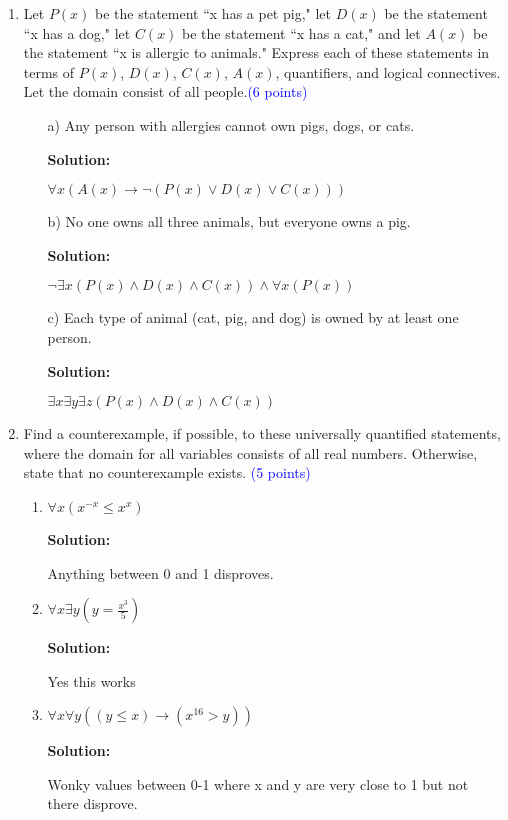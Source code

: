 \documentclass{article}
\newcommand{\pt}[1]{\textcolor{blue}{(#1 points)}}
\newenvironment{solution}
{
\par
\color{blue}
\textbf{Solution:}
}
{
\par
}
\begin{document}
\begin{enumerate}
    \item Let $P(x)$ be the statement ``x has a pet pig," let $D(x)$ be the statement ``x has a dog," let $C(x)$ be the statement ``x has a cat," and let $A(x)$ be the statement ``x is allergic to animals." Express each of these statements in terms of $P(x)$, $D(x)$, $C(x)$, $A(x)$, quantifiers, and logical connectives. Let the domain consist of all people.\pt{6}
    \begin{enumerate}
        \item[a)] Any person with allergies cannot own pigs, dogs, or cats.
        \begin{solution}
        $\forall x (A(x) \rightarrow \neg (P(x) \lor D(x) \lor C(x)))$
        \end{solution}
        \item[b)] No one owns all three animals, but everyone owns a pig.
        \begin{solution}
        $\neg \exists x (P(x) \land D(x) \land C(x)) \land \forall x (P(x))$
        \end{solution}
        \item[c)] Each type of animal (cat, pig, and dog) is owned by at least one person.
        \begin{solution}
        $\exists x \exists y \exists z (P(x) \land D(x) \land C(x))$
        \end{solution}
    \end{enumerate}
    
    \item{Find a counterexample, if possible, to these universally quantified statements, where the domain for all variables consists of all real numbers. Otherwise, state that no counterexample exists. \pt{5}}
    \begin{enumerate}
        \item $\forall x (x^{-x} \leq x^x)$
        \begin{solution}
        Anything between 0 and 1 disproves.
        \end{solution}
        \item $\forall x \exists y (y = \frac{x^3}{5})$
        \begin{solution}
        Yes this works
        \end{solution}
        \item $\forall x \forall y  ((y \leq x) \to (x^{16} > y))$
        \begin{solution}
        Wonky values between 0-1 where x and y are very close to 1 but not there disprove.
        \end{solution}
    \end{enumerate}
\end{enumerate}
\end{document}
